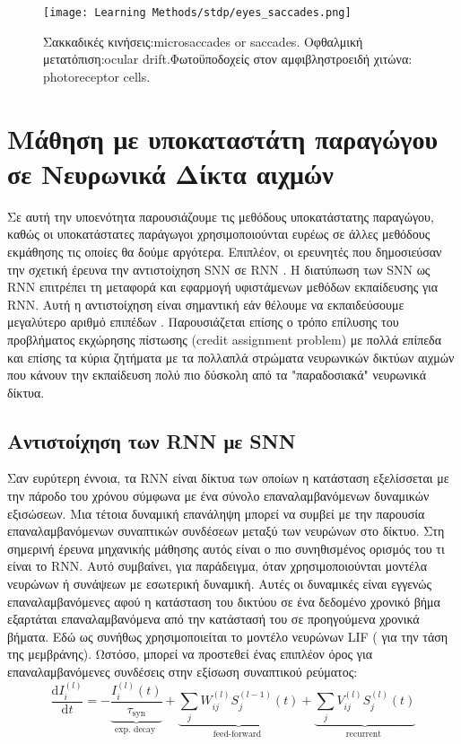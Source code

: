 \documentclass[12pt]{report}
\begin{document}
\begin{figure}[htp]
    \centering
    \texttt{[image: Learning Methods/stdp/eyes\_saccades.png]}
    \caption{Σακκαδικές κινήσεις:\textlatin{microsaccades or saccades}. Οφθαλμική μετατόπιση:\textlatin{ocular drift}.Φωτοϋποδοχείς στον αμφιβληστροειδή χιτώνα: \textlatin{photoreceptor cells}.}
    \label{fig:eyes_saccades}
\end{figure}

\section{Μάθηση με υποκαταστάτη παραγώγου σε Νευρωνικά Δίκτα αιχμών}

Σε αυτή την υποενότητα παρουσιάζουμε τις μεθόδους υποκατάστατης παραγώγου, καθώς οι υποκατάστατες παράγωγοι χρησιμοποιούνται ευρέως σε άλλες μεθόδους εκμάθησης τις οποίες θα δούμε αργότερα. Επιπλέον, οι ερευνητές που δημοσιεύσαν την σχετική έρευνα την αντιστοίχηση \textlatin{SNN} σε \textlatin{RNN} \cite{neftci2019}. Η διατύπωση των \textlatin{SNN} ως \textlatin{RNN} επιτρέπει τη μεταφορά και εφαρμογή υφιστάμενων μεθόδων εκπαίδευσης για \textlatin{RNN}. Αυτή η αντιστοίχηση είναι σημαντική εάν θέλουμε να εκπαιδεύσουμε μεγαλύτερο αριθμό επιπέδων . Παρουσιάζεται επίσης ο τρόπο επίλυσης του προβλήματος εκχώρησης πίστωσης (\textlatin{credit assignment problem}) με πολλά επίπεδα και επίσης τα κύρια ζητήματα με τα πολλαπλά στρώματα νευρωνικών δικτύων αιχμών που κάνουν την εκπαίδευση πολύ πιο δύσκολη από τα "παραδοσιακά" νευρωνικά δίκτυα. 

\subsection{Αντιστοίχηση των \textlatin{RNN} με \textlatin{SNN}}

Σαν ευρύτερη έννοια, τα \textlatin{RNN} είναι δίκτυα των οποίων η κατάσταση εξελίσσεται με την πάροδο του χρόνου σύμφωνα με ένα σύνολο επαναλαμβανόμενων δυναμικών εξισώσεων. Μια τέτοια δυναμική επανάληψη μπορεί να συμβεί με την παρουσία επαναλαμβανόμενων συναπτικών συνδέσεων μεταξύ των νευρώνων στο δίκτυο. Στη σημερινή έρευνα μηχανικής μάθησης αυτός είναι ο πιο συνηθισμένος ορισμός του τι είναι το \textlatin{RNN}. Αυτό συμβαίνει, για παράδειγμα, όταν χρησιμοποιούνται μοντέλα νευρώνων ή συνάψεων με εσωτερική δυναμική. Αυτές οι δυναμικές είναι εγγενώς επαναλαμβανόμενες αφού η κατάσταση του δικτύου σε ένα δεδομένο χρονικό βήμα εξαρτάται επαναλαμβανόμενα από την κατάστασή του σε προηγούμενα χρονικά βήματα. Εδώ ως συνήθως χρησιμοποιείται το μοντέλο νευρώνων \textlatin{LIF} ( για την τάση της μεμβράνης). Ωστόσο, μπορεί να προστεθεί ένας επιπλέον όρος για επαναλαμβανόμενες συνδέσεις στην εξίσωση συναπτικού ρεύματος:
\begin{equation}
\label{eqn:surrogate_current_dynamics}
\frac{\mathrm{d} I_{i}^{(l)}}{\mathrm{d} t}=-\underbrace{\frac{I_{i}^{(l)}(t)}{\tau_{\mathrm{syn}}}}_{\text {exp. decay }}+\underbrace{\sum_{j} W_{i j}^{(l)} S_{j}^{(l-1)}(t)}_{\text {feed-forward }}+\underbrace{\sum_{j} V_{i j}^{(l)} S_{j}^{(l)}(t)}_{\text {recurrent }}
\end{equation}
\end{document}
